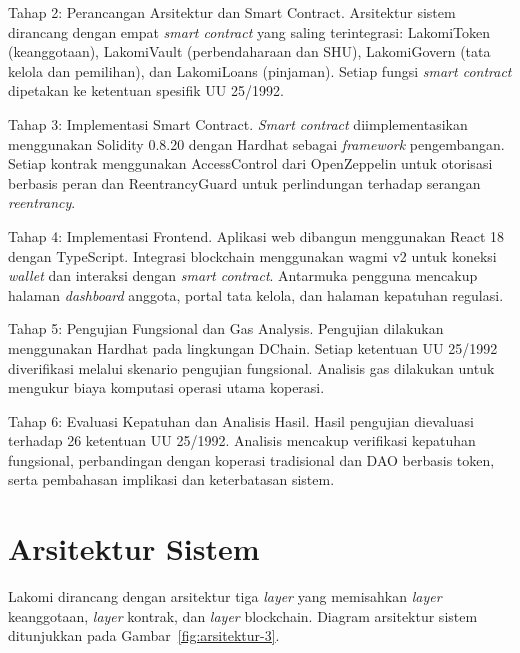 Tahap 2: Perancangan Arsitektur dan Smart Contract. Arsitektur sistem dirancang dengan empat \textit{smart contract} yang saling terintegrasi: LakomiToken (keanggotaan), LakomiVault (perbendaharaan dan SHU), LakomiGovern (tata kelola dan pemilihan), dan LakomiLoans (pinjaman). Setiap fungsi \textit{smart contract} dipetakan ke ketentuan spesifik UU 25/1992.

Tahap 3: Implementasi Smart Contract. \textit{Smart contract} diimplementasikan menggunakan Solidity 0.8.20 dengan Hardhat sebagai \textit{framework} pengembangan. Setiap kontrak menggunakan AccessControl dari OpenZeppelin untuk otorisasi berbasis peran dan ReentrancyGuard untuk perlindungan terhadap serangan \textit{reentrancy}.

Tahap 4: Implementasi Frontend. Aplikasi web dibangun menggunakan React 18 dengan TypeScript. Integrasi blockchain menggunakan wagmi v2 untuk koneksi \textit{wallet} dan interaksi dengan \textit{smart contract}. Antarmuka pengguna mencakup halaman \textit{dashboard} anggota, portal tata kelola, dan halaman kepatuhan regulasi.

Tahap 5: Pengujian Fungsional dan Gas Analysis. Pengujian dilakukan menggunakan Hardhat pada lingkungan DChain. Setiap ketentuan UU 25/1992 diverifikasi melalui skenario pengujian fungsional. Analisis gas dilakukan untuk mengukur biaya komputasi operasi utama koperasi.

Tahap 6: Evaluasi Kepatuhan dan Analisis Hasil. Hasil pengujian dievaluasi terhadap 26 ketentuan UU 25/1992. Analisis mencakup verifikasi kepatuhan fungsional, perbandingan dengan koperasi tradisional dan DAO berbasis token, serta pembahasan implikasi dan keterbatasan sistem.

\section{Arsitektur Sistem}

Lakomi dirancang dengan arsitektur tiga \textit{layer} yang memisahkan \textit{layer} keanggotaan, \textit{layer} kontrak, dan \textit{layer} blockchain. Diagram arsitektur sistem ditunjukkan pada Gambar~\ref{fig:arsitektur-3}.

